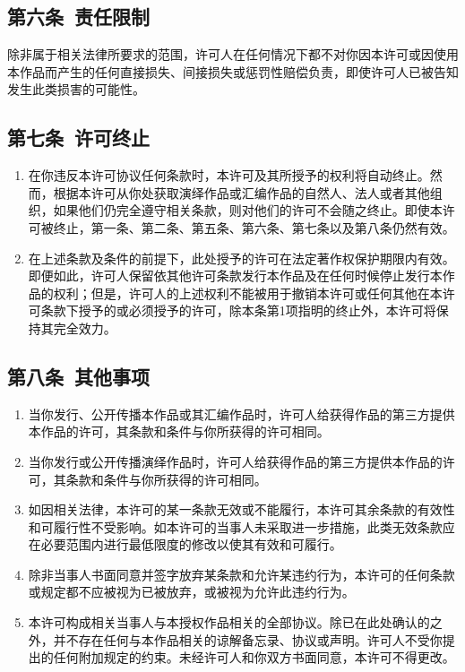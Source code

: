 \subsection{第六条\ 责任限制}
除非属于相关法律所要求的范围，许可人在任何情况下都不对你因本许可或因使用本作品而产生的任何直接损失、间接损失或惩罚性赔偿负责，即使许可人已被告知发生此类损害的可能性。 
\subsection{第七条\ 许可终止}
\begin{enumerate}
	\item 在你违反本许可协议任何条款时，本许可及其所授予的权利将自动终止。然而，根据本许可从你处获取演绎作品或汇编作品的自然人、法人或者其他组织，如果他们仍完全遵守相关条款，则对他们的许可不会随之终止。即使本许可被终止，第一条、第二条、第五条、第六条、第七条以及第八条仍然有效。
	\item 在上述条款及条件的前提下，此处授予的许可在法定著作权保护期限内有效。即便如此，许可人保留依其他许可条款发行本作品及在任何时候停止发行本作品的权利；但是，许可人的上述权利不能被用于撤销本许可或任何其他在本许可条款下授予的或必须授予的许可，除本条第1项指明的终止外，本许可将保持其完全效力。
\end{enumerate}
\subsection{第八条\ 其他事项}
\begin{enumerate}
	\item 当你发行、公开传播本作品或其汇编作品时，许可人给获得作品的第三方提供本作品的许可，其条款和条件与你所获得的许可相同。
	\item 当你发行或公开传播演绎作品时，许可人给获得作品的第三方提供本作品的许可，其条款和条件与你所获得的许可相同。
	\item 如因相关法律，本许可的某一条款无效或不能履行，本许可其余条款的有效性和可履行性不受影响。如本许可的当事人未采取进一步措施，此类无效条款应在必要范围内进行最低限度的修改以使其有效和可履行。
	\item 除非当事人书面同意并签字放弃某条款和允许某违约行为，本许可的任何条款或规定都不应被视为已被放弃，或被视为允许此违约行为。
	\item 本许可构成相关当事人与本授权作品相关的全部协议。除已在此处确认的之外，并不存在任何与本作品相关的谅解备忘录、协议或声明。许可人不受你提出的任何附加规定的约束。未经许可人和你双方书面同意，本许可不得更改。
\end{enumerate}
